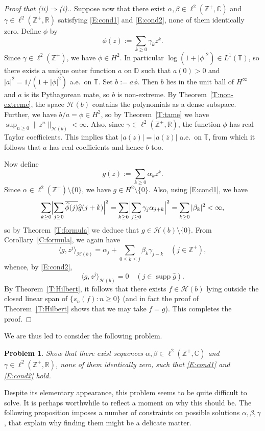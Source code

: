 \documentclass[11pt,reqno]{amsart}
\theoremstyle{plain}
\newtheorem{problem}[theorem]{Problem}
\theoremstyle{definition}
\theoremstyle{remark}
\newcommand{\cH}{\mathcal{H}}
\newcommand{\CC}{\mathbb{C}}
\newcommand{\DD}{\mathbb{D}}
\newcommand{\RR}{\mathbb{R}}
\newcommand{\ZZ}{\mathbb{Z}}
\newcommand{\TT}{\mathbb{T}}
\renewcommand{\hat}{\widehat}
\DeclareMathOperator{\supp}{supp}
\begin{document}
\begin{proof}[Proof that (ii)$\Rightarrow$(i).] 
Suppose now that there exist $\alpha,\beta\in\ell^2(\ZZ^+,\CC)$ and $\gamma\in \ell^2(\ZZ^+,\RR)$ satisfying
\eqref{E:cond1} and \eqref{E:cond2},
none of them identically zero.
Define $\phi$ by
\[
\phi(z):=\sum_{k\ge0}\gamma_k z^k.
\]
Since $\gamma\in\ell^2(\ZZ^+)$,
we have $\phi\in H^2$. 
In particular $\log(1+|\phi|^2)\in L^1(\TT)$, 
so there exists a unique outer function $a$ on $\DD$ 
such that $a(0)>0$ and $|a|^2=1/(1+|\phi|^2)$ a.e.\ on $\TT$.
Set $b:=a\phi$. Then $b$ lies in the unit ball of $H^\infty$ and $a$ is its Pythagorean mate,
so $b$ is non-extreme. 
By Theorem~\ref{T:non-extreme}, the space $\cH(b)$ contains the polynomials as a dense subspace.
Further, we have $b/a=\phi\in H^2$, so by Theorem~\ref{T:tame} we have $\sup_{n\ge0}\|z^n\|_{\cH(b)}<\infty$.
Also, since $\gamma\in\ell^2(\ZZ^+,\RR)$,
the function $\phi$ has real Taylor coefficients. 
This implies that $|a(z)|=|a(\overline{z})|$ a.e.\ on $\TT$,
from which it follows that $a$ has real coefficients and hence $b$ too.

Now define
\[
g(z):=\sum_{k\ge0}\alpha_kz^k.
\]
Since $\alpha\in\ell^2(\ZZ^+)\setminus\{0\}$, we have $g\in H^2\setminus\{0\}$.
Also, using \eqref{E:cond1}, we have
\[
\sum_{k\ge0}\Bigl|\sum_{j\ge0}\overline{\hat{\phi}(j)}\hat{g}(j+k)\Bigr|^2
=\sum_{k\ge0}\Bigl|\sum_{j\ge0}\gamma_j\alpha_{j+k}\Bigr|^2
=\sum_{k\ge0}|\beta_k|^2<\infty,
\]
so by Theorem~\ref{T:formula} we deduce that $g\in\cH(b)\setminus\{0\}$. 
From Corollary~\ref{C:formula}, we again have
\[
\langle g,z^j\rangle_{\cH(b)}=\alpha_j+\sum_{0\le k\le j}\beta_k\gamma_{j-k} \quad(j\in\ZZ^+),
\] 
whence, by \eqref{E:cond2}, 
\[
\langle g,z^j\rangle_{\cH(b)}=0 \quad(j\in\supp\hat{g}).
\]
By Theorem~\ref{T:Hilbert}, it follows that there exists $f\in\cH(b)$ lying outside 
the closed linear span of $\{s_n(f):n\ge0\}$ 
(and in fact the proof of Theorem~\ref{T:Hilbert} shows that we may take $f=g$).
This completes the proof.
\end{proof}

We are thus led to consider the following problem.

\begin{problem}\label{Pb:Anal1}
Show that there exist sequences $\alpha,\beta\in\ell^2(\ZZ^+,\CC)$ and $\gamma\in\ell^2(\ZZ^+,\RR)$, none of them identically zero, such that
\eqref{E:cond1} and \eqref{E:cond2} hold.
\end{problem}

Despite its elementary appearance, this problem seems 
to be quite difficult to solve.  
It is perhaps worthwhile to reflect a moment on why this should be.
The following proposition imposes a number of constraints
on possible solutions $\alpha,\beta,\gamma$,
that explain why finding them might 
be a delicate matter.
\end{document}
